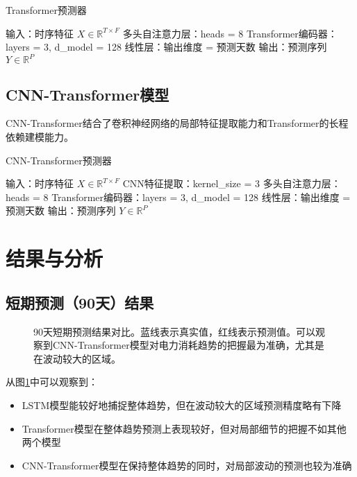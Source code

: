 \documentclass[a4paper,11pt]{article}
\begin{document}
\begin{algorithm}
\caption{Transformer预测器}
\begin{algorithmic}[1]
\STATE 输入：时序特征 $X \in \mathbb{R}^{T \times F}$
\STATE 多头自注意力层：heads = 8
\STATE Transformer编码器：layers = 3, d\_model = 128
\STATE 线性层：输出维度 = 预测天数
\STATE 输出：预测序列 $Y \in \mathbb{R}^{P}$
\end{algorithmic}
\end{algorithm}

\subsection{CNN-Transformer模型}
CNN-Transformer结合了卷积神经网络的局部特征提取能力和Transformer的长程依赖建模能力。

\begin{algorithm}
\caption{CNN-Transformer预测器}
\begin{algorithmic}[1]
\STATE 输入：时序特征 $X \in \mathbb{R}^{T \times F}$
\STATE CNN特征提取：kernel\_size = 3
\STATE 多头自注意力层：heads = 8
\STATE Transformer编码器：layers = 3, d\_model = 128
\STATE 线性层：输出维度 = 预测天数
\STATE 输出：预测序列 $Y \in \mathbb{R}^{P}$
\end{algorithmic}
\end{algorithm}

\section{结果与分析}

\subsection{短期预测（90天）结果}
\begin{figure}[htbp]
\centering
{}
\caption{90天短期预测结果对比。蓝线表示真实值，红线表示预测值。可以观察到CNN-Transformer模型对电力消耗趋势的把握最为准确，尤其是在波动较大的区域。}
\label{fig:short_term}
\end{figure}

从图\ref{fig:short_term}中可以观察到：
\begin{itemize}
    \item LSTM模型能较好地捕捉整体趋势，但在波动较大的区域预测精度略有下降
    \item Transformer模型在整体趋势预测上表现较好，但对局部细节的把握不如其他两个模型
    \item CNN-Transformer模型在保持整体趋势的同时，对局部波动的预测也较为准确
\end{itemize}
\end{document}
